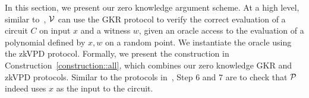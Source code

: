 In this section, we present our zero knowledge argument scheme. At a high level, similar to~\cite{zhang2017vsql,wahby2018doubly,zkvpd}, $\V$ can use the GKR protocol to verify the correct evaluation of a circuit $C$ on input $x$ and a witness $w$, given an oracle access to the evaluation of a polynomial defined by $x,w$ on a random point. We instantiate the oracle using the zkVPD protocol. Formally, we present the construction in Construction~\ref{construction::all}, which combines our zero knowledge GKR and zkVPD protocols. Similar to the protocols in~\cite{zkvpd,hyrax}, Step 6 and 7 are to check that $\P$ indeed uses $x$ as the input to the circuit.
\begin{figure}[H]
\small{
}
\end{figure}
